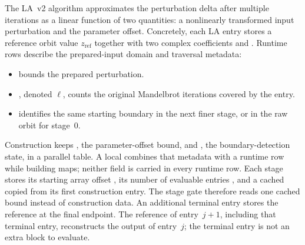 The LA~v2 algorithm approximates the perturbation delta after multiple
iterations as a linear function of two quantities: a nonlinearly transformed
input perturbation and the parameter offset.  Concretely, each LA entry stores
a reference orbit value \(z_\mathrm{ref}\) together with two complex
coefficients  and . Runtime rows describe the
prepared-input domain and traversal metadata:
\begin{itemize}
  \item {} bounds the prepared perturbation.
  \item {}, denoted $\ell$, counts the original
        Mandelbrot iterations covered by the entry.
  \item {} identifies the same starting boundary
        in the next finer stage, or in the raw orbit for stage~0.
\end{itemize}
Construction keeps , the parameter-offset bound, and
, the boundary-detection state, in a parallel
 table. A local 
combines that metadata with a runtime row while building maps; neither field
is carried in every runtime row. Each stage stores its starting array offset
, its number of evaluable entries , and
a cached  copied from its first construction entry.
The stage gate therefore reads one cached bound instead of construction data.
An additional terminal
entry stores the reference at the final endpoint. The reference of
entry~$j+1$, including that terminal entry, reconstructs the output of
entry~$j$; the terminal entry is not an extra block to evaluate.

